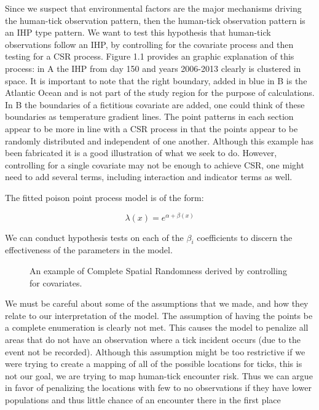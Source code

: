 \noindent Since we suspect that environmental factors are the major mechanisms driving the human-tick observation pattern, then the human-tick observation pattern is an IHP type pattern. We want to test this hypothesis  that human-tick observations follow an IHP, by controlling for the covariate process and then testing for a CSR process. Figure 1.1 provides an graphic explanation of this process: in A the IHP from day 150 and years 2006-2013 clearly is clustered in space. It is important to note that the right boundary, added in blue in B is the Atlantic Ocean and is not part of the study region for the purpose of calculations. In B the boundaries of a fictitious covariate are added, one could think of these boundaries as temperature gradient lines. The point patterns in each section appear to be more in line with a CSR process in that the points appear to be randomly distributed and independent of one another. Although this example has been fabricated it is a good illustration of what we seek to do. However, controlling for a single covariate may not be enough to achieve CSR, one might need to add several terms, including interaction and indicator terms as well.\newline
 
 
\noindent The fitted poison point process model is of the form:

\begin{equation}
\lambda(x) = e^{\alpha +\beta(x)}
\end{equation}

\noindent We can conduct hypothesis tests on each of the $\beta_i$ coefficients to discern the effectiveness of the parameters in the model. \newline


\begin{figure} [t]
\centerline{}
\caption{An example of Complete Spatial Randomness derived by controlling for covariates. }
\label{fig6}
\end{figure}

\noindent We must be careful about some of the assumptions that we made, and how they relate to our interpretation of the model. The assumption of having the points be a complete enumeration is clearly not met. This causes the model to penalize all areas that do not have an observation where a tick incident occurs (due to the event not be recorded). Although this assumption might be too restrictive if we were trying to create a mapping of all of the possible locations for ticks, this is not our goal, we are trying to map human-tick encounter risk. Thus we can argue in favor of penalizing the locations with few to no observations if they have lower populations and thus little chance of an encounter there in the first place\newline


